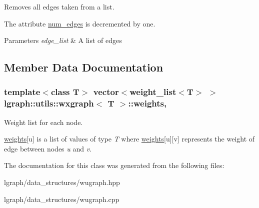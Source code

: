 Removes all edges taken from a list. 

The attribute \hyperlink{classlgraph_1_1utils_1_1xxgraph_a217ebb1cd8946fedfbf94a9b22f7da48}{num\+\_\+edges} is decremented by one. 
\begin{DoxyParams}{Parameters}
{\em edge\+\_\+list} & A list of edges \\
\hline
\end{DoxyParams}


\subsection{Member Data Documentation}
\subsubsection[{\texorpdfstring{weights}{weights}}]{\setlength{\rightskip}{0pt plus 5cm}template$<$class T$>$ vector$<${\bf weight\+\_\+list}$<$T$>$ $>$ {\bf lgraph\+::utils\+::wxgraph}$<$ T $>$\+::weights\hspace{0.3cm}{\ttfamily [protected]}, {\ttfamily [inherited]}}\hypertarget{classlgraph_1_1utils_1_1wxgraph_a15569c8c0fccb641709dc81eb0e29c94}{}\label{classlgraph_1_1utils_1_1wxgraph_a15569c8c0fccb641709dc81eb0e29c94}


Weight list for each node. 

\hyperlink{classlgraph_1_1utils_1_1wxgraph_a15569c8c0fccb641709dc81eb0e29c94}{weights}\mbox{[}u\mbox{]} is a list of values of type {\itshape T} where \hyperlink{classlgraph_1_1utils_1_1wxgraph_a15569c8c0fccb641709dc81eb0e29c94}{weights}\mbox{[}u\mbox{]}\mbox{[}v\mbox{]} represents the weight of edge between nodes {\itshape u} and {\itshape v}. 

The documentation for this class was generated from the following files\+:\begin{DoxyCompactItemize}
\item 
lgraph/data\+\_\+structures/wugraph.\+hpp\item 
lgraph/data\+\_\+structures/wugraph.\+cpp\end{DoxyCompactItemize}
